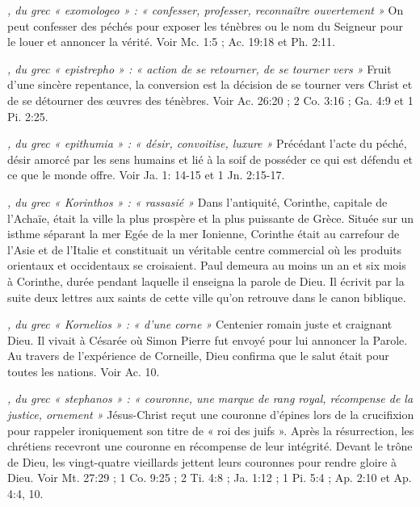 \begin{multicols}{2}
{\textit{, du grec « exomologeo » : « confesser, professer, reconnaître ouvertement »}\newline
On peut confesser des péchés pour exposer les ténèbres ou le nom du Seigneur pour le louer et annoncer la vérité. Voir Mc. 1:5 ; Ac. 19:18 et Ph. 2:11.

\textit{, du grec « epistrepho » : « action de se retourner, de se tourner vers »}\newline
Fruit d'une sincère repentance, la conversion est la décision de se tourner vers Christ et de se détourner des œuvres des ténèbres. Voir Ac. 26:20 ; 2 Co. 3:16 ; Ga. 4:9 et 1 Pi. 2:25.

\textit{, du grec « epithumia » : « désir, convoitise, luxure »}\newline
Précédant l'acte du péché, désir amorcé par les sens humains et lié à la soif de posséder ce qui est défendu et ce que le monde offre. Voir Ja. 1: 14-15 et 1 Jn. 2:15-17.

\textit{, du grec « Korinthos » : « rassasié »}\newline
Dans l'antiquité, Corinthe, capitale de l'Achaïe, était la ville la plus prospère et la plus puissante de Grèce. Située sur un isthme séparant la mer Egée de la mer Ionienne, Corinthe était au carrefour de l'Asie et de l'Italie et constituait un véritable centre commercial où les produits orientaux et occidentaux se croisaient. Paul demeura au moins un an et six mois à Corinthe, durée pendant laquelle il enseigna la parole de Dieu. Il écrivit par la suite deux lettres aux saints de cette ville qu'on retrouve dans le canon biblique.

\textit{, du grec « Kornelios » : « d'une corne »}\newline
Centenier romain juste et craignant Dieu. Il vivait à Césarée où Simon Pierre fut envoyé pour lui annoncer la Parole. Au travers de l'expérience de Corneille, Dieu confirma que le salut était pour toutes les nations. Voir Ac. 10.

\textit{, du grec « stephanos » : « couronne, une marque de rang royal, récompense de la justice, ornement »}\newline
Jésus-Christ reçut une couronne d'épines lors de la crucifixion pour rappeler ironiquement son titre de « roi des juifs ». Après la résurrection, les chrétiens recevront une couronne en récompense de leur intégrité. Devant le trône de Dieu, les vingt-quatre vieillards jettent leurs couronnes pour rendre gloire à Dieu. Voir Mt. 27:29 ; 1 Co. 9:25 ; 2 Ti. 4:8 ; Ja. 1:12 ; 1 Pi. 5:4 ; Ap. 2:10 et Ap. 4:4, 10.

}
\end{multicols}
